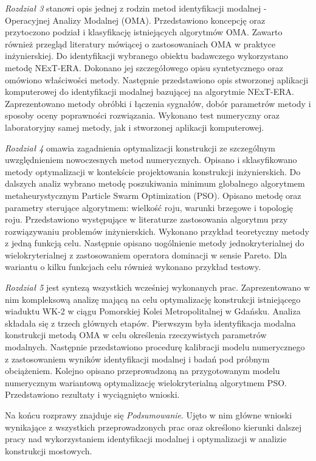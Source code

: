 \textit{Rozdział 3} stanowi opis jednej z rodzin metod identyfikacji modalnej - Operacyjnej Analizy Modalnej (OMA). Przedstawiono koncepcję oraz przytoczono podział i klasyfikację istniejących algorytmów OMA. Zawarto również przegląd literatury mówiącej o zastosowaniach OMA w praktyce inżynierskiej. Do identyfikacji wybranego obiektu badawczego wykorzystano metodę NExT-ERA. Dokonano jej szczegółowego opisu syntetycznego oraz omówiono właściwości metody. Następnie przedstawiono opis stworzonej aplikacji komputerowej do identyfikacji modalnej bazującej na algorytmie NExT-ERA. Zaprezentowano metody obróbki i łączenia sygnałów, dobór parametrów metody i sposoby oceny poprawności rozwiązania. Wykonano test numeryczny oraz laboratoryjny samej metody, jak i stworzonej aplikacji komputerowej.

\textit{Rozdział 4} omawia zagadnienia optymalizacji konstrukcji ze szczególnym uwzględnieniem nowoczesnych metod numerycznych. Opisano i sklasyfikowano metody optymalizacji w kontekście projektowania konstrukcji inżynierskich. Do dalszych analiz wybrano metodę poszukiwania minimum globalnego algorytmem metaheurystycznym Particle Swarm Optimization (PSO). Opisano metodę oraz parametry sterujące algorytmem: wielkość roju, warunki brzegowe i topologię roju. Przedstawiono występujące w literaturze zastosowania algorytmu przy rozwiązywaniu problemów inżynierskich. Wykonano przykład teoretyczny metody z jedną funkcją celu. Następnie opisano uogólnienie metody jednokryterialnej do wielokryterialnej z zastosowaniem operatora dominacji w sensie Pareto. Dla wariantu o kilku funkcjach celu również wykonano przykład testowy.

\textit{Rozdział 5} jest syntezą wszystkich wcześniej wykonanych prac. Zaprezentowano w nim kompleksową analizę mającą na celu optymalizację konstrukcji istniejącego wiaduktu WK-2 w ciągu Pomorskiej Kolei Metropolitalnej w Gdańsku. Analiza składała się z trzech głównych etapów. Pierwszym była identyfikacja modalna konstrukcji metodą OMA w celu określenia rzeczywistych parametrów modalnych. Następnie przedstawiono procedurę kalibracji modelu numerycznego z zastosowaniem wyników identyfikacji modalnej i badań pod próbnym obciążeniem. Kolejno opisano przeprowadzoną na przygotowanym modelu numerycznym wariantową optymalizację wielokryterialną algorytmem PSO. Przedstawiono rezultaty i wyciągnięto wnioski.

Na końcu rozprawy znajduje się \textit{Podsumowanie}. Ujęto w nim główne wnioski wynikające z wszystkich przeprowadzonych prac oraz określono kierunki dalszej pracy nad wykorzystaniem identyfikacji modalnej i optymalizacji w analizie konstrukcji mostowych.





